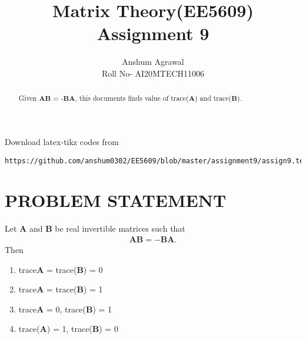 \documentclass[journal,12pt,twocolumn]{IEEEtran}
\begin{document}
\makeatother
\let\StandardTheFigure\thefigure
\let\vec\mathbf
\renewcommand{\thefigure}{\theproblem}
\def\putbox#1#2#3{\makebox[0in][l]{\makebox[#1][l]{}\raisebox{\baselineskip}[0in][0in]{\raisebox{#2}[0in][0in]{#3}}}}
     \def\rightbox#1{\makebox[0in][r]{#1}}
     \def\centbox#1{\makebox[0in]{#1}}
     \def\topbox#1{\raisebox{-\baselineskip}[0in][0in]{#1}}
     \def\midbox#1{\raisebox{-0.5\baselineskip}[0in][0in]{#1}}
\vspace{3cm}
\title{Matrix Theory(EE5609) Assignment 9}
\author{Anshum Agrawal \\ Roll No- AI20MTECH11006}
%
\maketitle
\newpage
\bigskip
\renewcommand{\thefigure}{\theenumi}
\renewcommand{\thetable}{\arabic{table}}
\begin{abstract}
Given $\vec{A}\vec{B}$ = -$\vec{B}\vec{A}$, this documents finds value of trace($\vec{A}$) and trace($\vec{B}$).   
\end{abstract}
%
Download latex-tikz codes from 
%
\begin{lstlisting}
https://github.com/anshum0302/EE5609/blob/master/assignment9/assign9.tex
\end{lstlisting}
%
\section{\textbf{PROBLEM STATEMENT}}
Let $\vec{A}$ and $\vec{B}$ be real invertible matrices such that 
\begin{align}
    \vec{AB}=-\vec{BA}\label{eq1}.
\end{align}
Then
\begin{enumerate}
    \item trace{$\vec{A}$} = trace($\vec{B}$) = 0
    \item trace{$\vec{A}$} = trace($\vec{B}$) = 1
    \item trace{$\vec{A}$} = 0, trace($\vec{B}$) = 1
    \item trace($\vec{A}$) = 1, trace($\vec{B}$) = 0
\end{enumerate}
\end{document}
